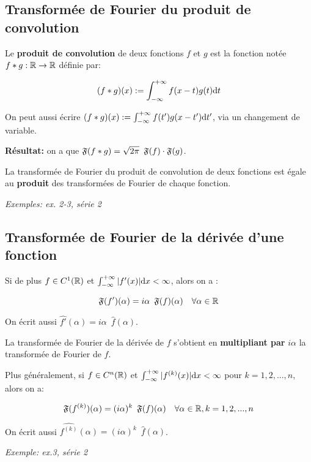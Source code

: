 \subsection{Transformée de Fourier du produit de convolution}

\begin{definition}
    Le \textbf{produit de convolution} de deux fonctions $f$ et $g$ est la fonction notée $f \ast g: \mathbb{R} \rightarrow \mathbb{R}$ définie par:
    
    \[(f \ast g)(x) := \int_{-\infty}^{+\infty} f(x - t) g(t) \mathrm{d}t\]
\end{definition}

\begin{remark}
    On peut aussi écrire $(f \ast g)(x) := \int_{-\infty}^{+\infty} f(t') g(x - t') \mathrm{d}t'$, via un changement de variable.
\end{remark}

\textbf{Résultat:} on a que $\mathfrak{F}(f \ast g) = \sqrt{2\pi} \enspace \mathfrak{F}(f) \cdot \mathfrak{F}(g)$.

La transformée de Fourier du produit de convolution de deux fonctions est égale au \textbf{produit} des transformées de Fourier de chaque fonction.

\textit{Exemples: ex. 2-3, série 2}


\subsection{Transformée de Fourier de la dérivée d'une fonction}

Si de plus $f \in C^1(\mathbb{R})$ et $\int_{-\infty}^{+\infty} |f'(x)| \mathrm{d}x < \infty$, alors on a :

\[\mathfrak{F}(f')(\alpha) = i\alpha \enspace \mathfrak{F}(f)(\alpha) \quad \forall \alpha \in \mathbb{R}\]

On écrit aussi $\widehat{f'}(\alpha) = i\alpha \enspace \hat{f}(\alpha)$.

La transformée de Fourier de la dérivée de $f$ s'obtient en \textbf{multipliant par} $i\alpha$ la transformée de Fourier de $f$.

Plus généralement, si $f\in C^n(\mathbb{R})$ et $\int_{-\infty}^{+\infty} |f^{(k)}(x)| \mathrm{d}x < \infty$ pour $k=1,2,...,n$, alors on a:

\[\mathfrak{F}(f^{(k)})(\alpha) = (i\alpha)^k \enspace \mathfrak{F}(f)(\alpha) \quad \forall \alpha \in \mathbb{R}, k = 1,2,...,n\]

On écrit aussi $\widehat{f^{(k)}}(\alpha) = (i\alpha)^k \enspace \hat{f}(\alpha)$.

\textit{Exemple: ex.3, série 2}


